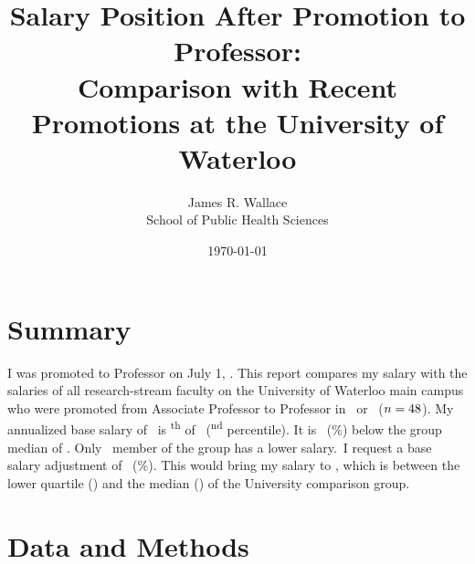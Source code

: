 \documentclass{article}
\title{Salary Position After Promotion to Professor:\\ Comparison with Recent Promotions at the University of Waterloo}
\author{James R. Wallace\\ School of Public Health Sciences}
\date{\today}
\newif\ifUnitComparisons
\begin{document}
\maketitle

\section*{Summary}

I was promoted to Professor on July 1, \PoolYear. This report compares my salary with the salaries of all research-stream faculty on the University of Waterloo main campus who were promoted from Associate Professor to Professor in \PoolPrevYear\ or \PoolYear\ ($n = 48$). My annualized base salary of \SubjectBase\ is \SubjectRank\textsuperscript{th} of \PoolN\ (\SubjectPercentile\textsuperscript{nd} percentile). It is \GapMedian\ (\GapMedianPct\%) below the group median of \PoolMedian. Only \NumBelowSubject\ member of the group has a lower salary.\ifUnitComparisons\ Differences in pay between Faculties do not explain my rank: among the \HealthN\ members of the group in the Faculty of Health, my salary is the lowest, and within the School of Public Health Sciences all \SphsNProfAbove\ other Professors were paid more in \PoolYear\ than my annualized base.\fi\ I request a base salary adjustment of \RequestAdj\ (\RequestPct\%). This would bring my salary to \RequestTarget, which is between the lower quartile (\PoolQOne) and the median (\PoolMedian) of the University comparison group.

\section*{Data and Methods}
\end{document}

